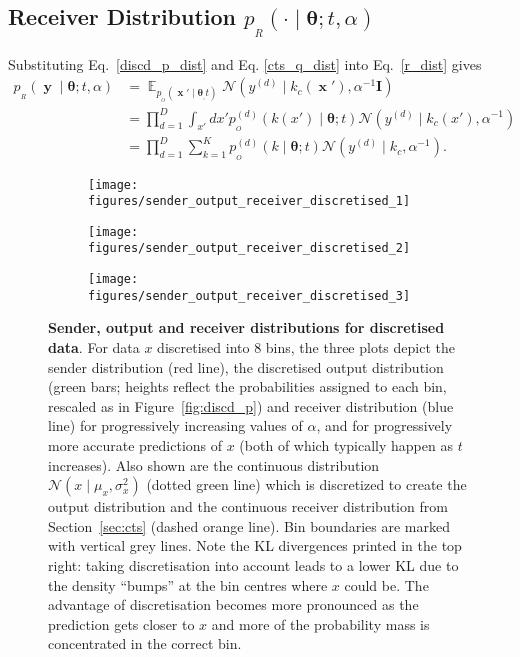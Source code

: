 \documentclass[11pt,table]{article}
\DeclareMathOperator*{\E}{\mathbb{E}}
\DeclareMathOperator{\x}{\mathbf{x}}
\DeclareMathOperator{\y}{\mathbf{y}}
\newcommand{\N}[2]{\mathcal{N}\left(#1 , #2\right)}
\newcommand{\I}[1]{\boldsymbol{I}}
\newcommand{\tidx}[2]{#1_{#2}}
\newcommand{\didx}[2]{#1^{(#2)}}
\renewcommand{\vec}[1]{\boldsymbol{#1}}
\newcommand{\pars}{\theta}
\newcommand{\parsn}{\vec{\pars}}
\newcommand{\parsnt}[1]{\tidx{\parsn}{#1}}
\newcommand{\0}[1]{\constvec{0}{#1}}
\newcommand{\1}[1]{\constvec{1}{#1}}
\newcommand{\yd}{y}
\newcommand{\ydd}[1]{\didx{\yd}{#1}}
\newcommand{\out}{p_{_O}}
\newcommand{\rec}{p_{_R}}
\begin{document}
\subsection{Receiver Distribution \texorpdfstring{$\rec(\cdot \mid \parsn; t, \alpha)$}{}}
Substituting Eq.~\ref{discd_p_dist} and Eq. \ref{cts_q_dist} into Eq.~\ref{r_dist} gives
\begin{align}
\rec(\y \mid \parsn; t, \alpha) &= \E_{\out(\x' \mid \parsnt, t)}\N{\ydd{d} \mid k_c(\x')}{\alpha^{-1} \I{D}}\\
&= \prod_{d=1}^D \int_{x'}d x' {\out^{(d)}\left(k(x') \mid \parsn; t\right)}\N{\ydd{d} \mid k_c(x')}{\alpha^{-1}}\\
&= \prod_{d=1}^D \sum_{k=1}^K \out^{(d)}(k \mid \parsn; t) \N{\ydd{d} \mid k_c}{\alpha^{-1}}\label{discd_r_dist_1}.
\end{align}
\begin{figure}[t!]
\centering
\begin{subfigure}[b]{\textwidth}
\texttt{[image: figures/sender\_output\_receiver\_discretised\_1]}
\end{subfigure}
\begin{subfigure}[b]{\textwidth}
\texttt{[image: figures/sender\_output\_receiver\_discretised\_2]}
\end{subfigure}
\begin{subfigure}[b]{\textwidth}
\texttt{[image: figures/sender\_output\_receiver\_discretised\_3]}
\end{subfigure}
\caption{\textbf{Sender, output and receiver distributions for discretised data}. For data $x$ discretised into 8 bins, the three plots depict the sender distribution (red line), the discretised output distribution (green bars; heights reflect the probabilities assigned to each bin, rescaled as in Figure~\ref{fig:discd_p}) and receiver distribution (blue line) for progressively increasing values of $\alpha$, and for progressively more accurate predictions of $x$ (both of which typically happen as $t$ increases). Also shown are the continuous distribution $\mathcal{N}(x \mid \mu_x, \sigma^2_x)$ (dotted green line) which is discretized to create the output distribution and the continuous receiver distribution from Section~\ref{sec:cts} (dashed orange line). Bin boundaries are marked with vertical grey lines. Note the KL divergences printed in the top right: taking discretisation into account leads to a lower KL due to the density ``bumps'' at the bin centres where $x$ could be. The advantage of discretisation becomes more pronounced as the prediction gets closer to $x$ and more of the probability mass is concentrated in the correct bin.}
\end{figure}
\end{document}

